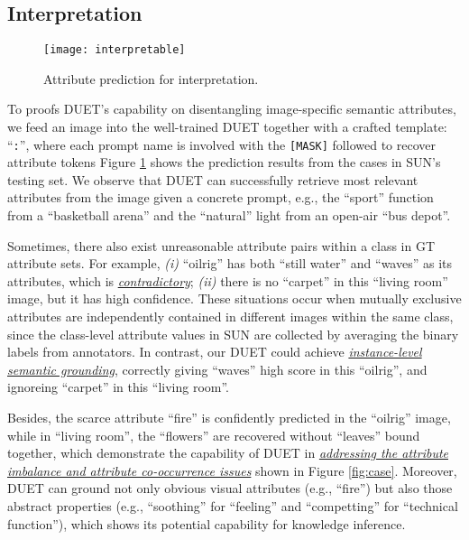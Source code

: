 \documentclass[letterpaper]{article} \usepackage{aaai23}  \usepackage{times}  \usepackage{helvet}  \usepackage{courier}  \usepackage[hyphens]{url}  \usepackage{graphicx} \urlstyle{rm} \def\UrlFont{\rm}  \usepackage{natbib}  \usepackage{caption} \frenchspacing  \setlength{\pdfpagewidth}{8.5in}  \setlength{\pdfpageheight}{11in}  \usepackage{algorithm}
\newcommand{\fy}[1]{{\color{black}#1}}
\begin{document}
\subsection{Interpretation
}
\begin{figure}[htbp]
  \centering
  \texttt{[image: interpretable]}
  \vspace{-2pt}
  \caption{{Attribute prediction for interpretation.}
}
  \label{fig:interpretable}
  \vspace{-5pt}
\end{figure}
To proofs DUET's capability on disentangling image-specific semantic attribute\fy{s},
we feed an image into the well-trained DUET together with a crafted template: ``{\tt :}'', 
where each prompt name  is involved with the {\tt [MASK]} followed to recover attribute tokens 
Figure \ref{fig:interpretable} shows the prediction results from the cases in SUN's testing set.
We observe that DUET can successfully retrieve most relevant attributes from the image given {a} concrete prompt, e.g., the ``sport'' function from a ``basketball arena'' and the ``natural'' light from an open-air ``bus depot''.

Sometimes, there also exist unreasonable attribute pairs within a class in GT attribute sets.
{For example,}
\textit{(i)} ``oilrig'' has \fy{both} ``still water'' and ``waves'' as its attributes, which is \ul{\emph{contradictory}}{;} 
\textit{(ii)} there is no ``carpet'' in this ``living room'' image, but it has high confidence.
These \fy{situations occur} when mutually exclusive attributes \fy{are} independently contained in different images within the same class, since the class-level attribute values in SUN are collected by averaging the binary labels from  annotators.
In contrast, our DUET could achieve \ul{\emph{instance-level semantic grounding}}, correctly \fy{giving} ``waves'' high score in this ``oilrig'', and ignore\fy{ing} ``carpet'' in this ``living room''.

Besides, the scarce attribute ``fire'' is confidently predicted in the ``oilrig'' image, 
\fy{while} in ``living room''\fy{,} the ``flowers'' \fy{are} recovered without ``leaves'' bound together, which demonstrate the 
{capability of DUET in \ul{\emph{addressing the attribute imbalance and attribute co-occurrence issues}} shown in Figure \ref{fig:case}.} 
Moreover, DUET can ground not only obvious visual attributes (e.g., ``fire'') but also those abstract properties (e.g., ``soothing'' for ``feeling'' and ``competting'' for ``technical function''), which 
{shows its potential capability}
for {knowledge inference}.
\end{document}
